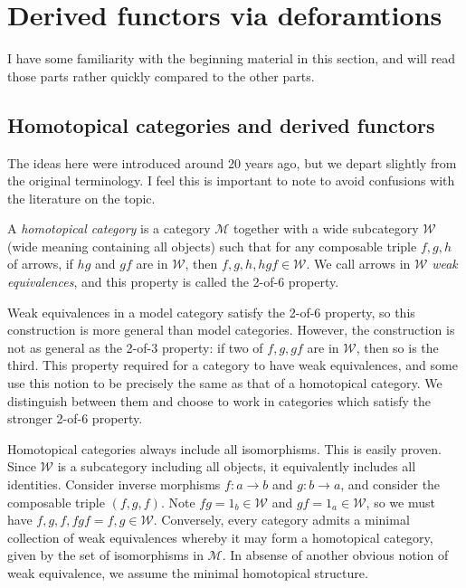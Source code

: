 \chapter{Derived functors via deforamtions}

I have some familiarity with the beginning material in this section, and will read those parts rather quickly compared to the other parts.

\section{Homotopical categories and derived functors}

The ideas here were introduced around 20 years ago, but we depart slightly from the original terminology. I feel this is important to note to avoid confusions with the literature on the topic.

\begin{definition}\label{dfn:2.1}
	A \emph{homotopical category} is a category $\mathcal{M} $ together with a wide subcategory $\mathcal{W} $ (wide meaning containing all objects) such that for any composable triple $f,g,h$ of arrows, if $hg$ and $gf$ are in $\mathcal{W} $, then $f,g,h,hgf\in \mathcal{W} $. We call arrows in $\mathcal{W} $ \emph{weak equivalences}, and this property is called the 2-of-6 property.
\end{definition}
\begin{remark}
	Weak equivalences in a model category satisfy the 2-of-6 property, so this construction is more general than model categories. However, the construction is not as general as the 2-of-3 property: if two of $f,g,gf$ are in $\mathcal{W} $, then so is the third. This property required for a category to have weak equivalences, and some use this notion to be precisely the same as that of a homotopical category. We distinguish between them and choose to work in categories which satisfy the stronger 2-of-6 property.
\end{remark}

Homotopical categories always include all isomorphisms. This is easily proven. Since $\mathcal{W} $ is a subcategory including all objects, it equivalently includes all identities. Consider inverse morphisms $f : a \to b$ and $g : b \to a$, and consider the composable triple $(f,g,f)$. Note $fg=1_b\in \mathcal{W} $ and $gf=1_a\in \mathcal{W} $, so we must have $f,g,f,fgf=f,g\in \mathcal{W} $. Conversely, every category admits a minimal collection of weak equivalences whereby it may form a homotopical category, given by the set of isomorphisms in $\mathcal{M} $. In absense of another obvious notion of weak equivalence, we assume the minimal homotopical structure.

